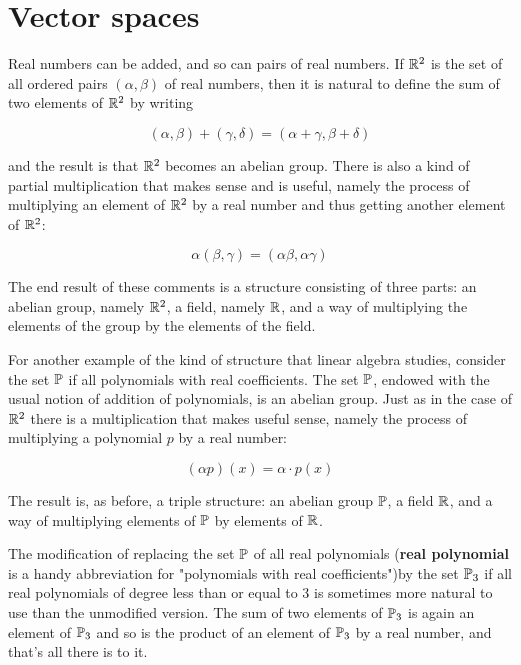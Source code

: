 \section{Vector spaces}

Real numbers can be added, and so can pairs of real numbers. If $\R^2$ is the set of all ordered pairs $(\alpha, \beta)$ of real numbers, then it is natural to define the sum of two elements of $\R^2$ by writing

\begin{equation}
    (\alpha,\beta) + (\gamma, \delta) = (\alpha+\gamma, \beta+\delta)
\end{equation}

and the result is that $\R^2$ becomes an abelian group. There is also a kind of partial multiplication that makes sense and is useful, namely the process of multiplying an element of $\R^2$ by a real number and thus getting another element of $\R^2$:

\begin{equation}
    \alpha(\beta, \gamma) = (\alpha\beta, \alpha\gamma)
\end{equation}

The end result of these comments is a structure consisting of three parts: an abelian group, namely $\R^2$, a field, namely $\R$, and a way of multiplying the elements of the group by the elements of the field.

For another example of the kind of structure that linear algebra studies, consider the set $\P$ if all polynomials with real coefficients. The set $\P$, endowed with the usual notion of addition of polynomials, is an abelian group. Just as in the case of $\R^2$ there is a multiplication that makes useful sense, namely the process of multiplying a polynomial $p$ by a real number:

\begin{equation}
    (\alpha p)(x) = \alpha \cdot p(x)
\end{equation}

The result is, as before, a triple structure: an abelian group $\P$, a field $\R$, and a way of multiplying elements of $\P$ by elements of $\R$.

The modification of replacing the set $\P$ of all real polynomials (\textbf{real polynomial} is a handy abbreviation for "polynomials with real coefficients")by the set $\P_3$ if all real polynomials of degree less than or equal to 3 is sometimes more natural to use than the unmodified version. The sum of two elements of $\P_3$ is again an element of $\P_3$ and so is the product of an element of $\P_3$ by a real number, and that's all there is to it.

